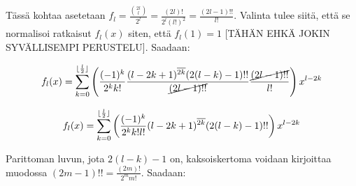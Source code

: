 \documentclass[../johdoksia.tex]{subfiles}
\begin{document}
	\noindent Tässä kohtaa asetetaan $f_l  = \frac{\binom{2l}{l}}{2^l} = \frac{(2l)!}{2^l(l!)^2} = \frac{(2l - 1)!!}{l!}$. Valinta tulee siitä, että se normalisoi ratkaisut $f_l(x)$ siten, että $f_l(1) = 1$ [TÄHÄN EHKÄ JOKIN SYVÄLLISEMPI PERUSTELU]. Saadaan:
	
	\begin{equation*}
		f_l(x) = \sum_{k = 0}^{\lfloor\frac{l}{2}\rfloor}\left(\frac{(-1)^k}{2^{k} k!}\frac{(l - 2k + 1)^{\overline{2k}}(2(l - k) - 1)!!}{\cancel{(2l - 1)!!}}\frac{\cancel{(2l - 1)!!}}{l!}\right)x^{l - 2k}
	\end{equation*}
		
	\begin{equation*}
		f_l(x) = \sum_{k = 0}^{\lfloor\frac{l}{2}\rfloor}\left(\frac{(-1)^k}{2^{k} k!l!}(l - 2k + 1)^{\overline{2k}}(2(l - k) - 1)!!\right)x^{l - 2k}
	\end{equation*}

	\noindent Parittoman luvun, jota $2(l - k) - 1$ on, kaksoiskertoma voidaan kirjoittaa muodossa $(2m - 1)!! = \frac{(2m)!}{2^mm!}$. Saadaan:
\end{document}
